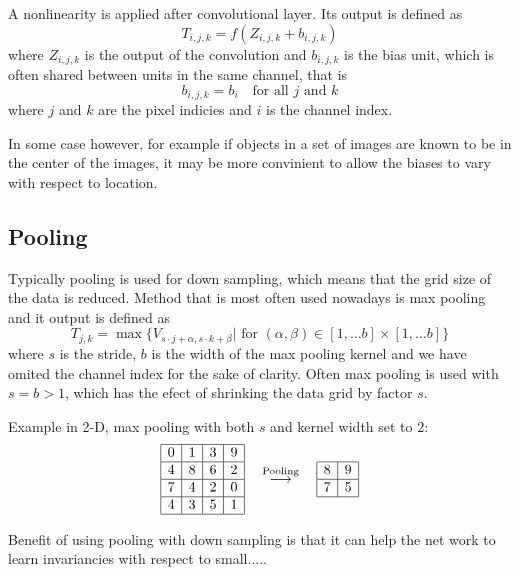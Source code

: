 \documentclass[]{article}
\begin{document}
A nonlinearity is applied after convolutional layer. Its output is defined as
\[
T_{i,j,k} = f(Z_{i, j, k} + b_{i,j,k})
\]
where $Z_{i, j, k}$ is the output of the convolution and $b_{i, j, k}$ is the bias
unit, which is often shared between units in the same channel, that is
\[
b_{i, j, k} = b_i \quad \text{for all $j$ and $k$}
\]
where $j$ and $k$ are the pixel indicies and $i$ is the channel index.

In some case however, for example if objects in a set of images are known to be
in the center of the images, it may be more convinient to allow the biases to vary
with respect to location.

\subsection{Pooling}
Typically pooling is used for down sampling, which means that the grid size of
the data is reduced. Method that is most often used nowadays is max pooling and
it output is defined as
\[
T_{j,k} = \max \{V_{s \cdot j + \alpha, s \cdot k + \beta} |
\text{ for $(\alpha, \beta) \in [1,\ldots b] \times  [1,\ldots b]$} \}
\]
where $s$ is the stride, $b$ is the width of the max pooling kernel and we have
omited the channel index for the sake of clarity. Often max pooling is used with
$s = b > 1$, which has the efect of shrinking the data grid by factor $s$.

Example in 2-D, max pooling with both $s$ and kernel width set to 2:
\[
\begin{array}{|c|c|c|c|}
  \hline
  0 & 1 & 3 & 9\\
  \hline
  4 & 8 & 6 & 2\\
  \hline
  7 & 4 & 2 & 0\\
  \hline
  4 & 3 & 5 & 1\\
  \hline
 \end{array}
 \quad \stackrel{\text{Pooling}}{\longrightarrow} \quad
 \begin{array}{|c|c|}
   \hline
   8 & 9\\
   \hline
   7 & 5\\
   \hline
  \end{array}
 \]

Benefit of using pooling with down sampling is that it can help the net work
to learn invariancies with respect to small.....
\end{document}
